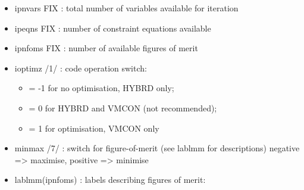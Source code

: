 \documentclass[
]{article}
\providecommand{\tightlist}{%
  \setlength{\itemsep}{0pt}\setlength{\parskip}{0pt}}
\begin{document}
\begin{itemize}
\tightlist
\item
  ipnvars FIX : total number of variables available for iteration
\item
  ipeqns FIX : number of constraint equations available
\item
  ipnfoms FIX : number of available figures of merit
\item
  ioptimz /1/ : code operation switch:

  \begin{itemize}
  \tightlist
  \item
    = -1 for no optimisation, HYBRD only;
  \item
    = 0 for HYBRD and VMCON (not recommended);
  \item
    = 1 for optimisation, VMCON only
  \end{itemize}
\item
  minmax /7/ : switch for figure-of-merit (see lablmm for descriptions)
  negative =\textgreater{} maximise, positive =\textgreater{} minimise
\item
  lablmm(ipnfoms) : labels describing figures of merit:


\end{itemize}
\end{document}

